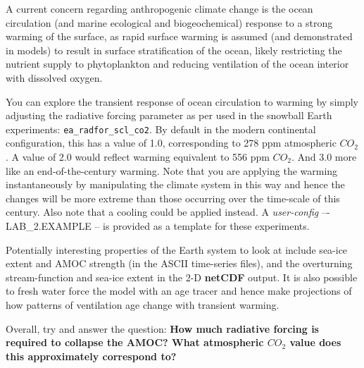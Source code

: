 A current concern regarding anthropogenic climate change is the ocean circulation (and marine ecological and biogeochemical) response to a strong warming of the surface, as rapid surface warming is assumed (and demonstrated in models) to result in surface stratification of the ocean, likely restricting the nutrient supply to phytoplankton and reducing ventilation of the ocean interior with dissolved oxygen.

You can explore the transient response of ocean circulation to warming by simply adjusting the radiative forcing parameter as per used in the snowball Earth experiments: \texttt{ea\_radfor\_scl\_co2}. By default in the modern continental configuration, this has a value of 1.0, corresponding to 278 ppm atmospheric \(CO_{2}\). A value of 2.0 would reflect warming equivalent to 556 ppm \(CO_{2}\). And 3.0 more like an end-of-the-century warming. Note that you are applying the warming instantaneously by manipulating the climate system in this way and hence the changes will be more extreme than those occurring over the time-scale of this century. Also note that a cooling could be applied instead. A \textit{user-config} –- \textsf{\footnotesize LAB\_2.EXAMPLE} – is provided as a template for these experiments.

Potentially interesting properties of the Earth system to look at include sea-ice extent and AMOC strength (in the ASCII time-series files), and the overturning stream-function and sea-ice extent in the 2-D \textbf{netCDF} output. It is also possible to fresh water force the model with an age tracer and hence make projections of how patterns of ventilation age change with transient warming.

Overall, try and answer the question: \textbf{How much radiative forcing is required to collapse the AMOC? What atmospheric \(CO_{2}\) value does this approximately correspond to?}

